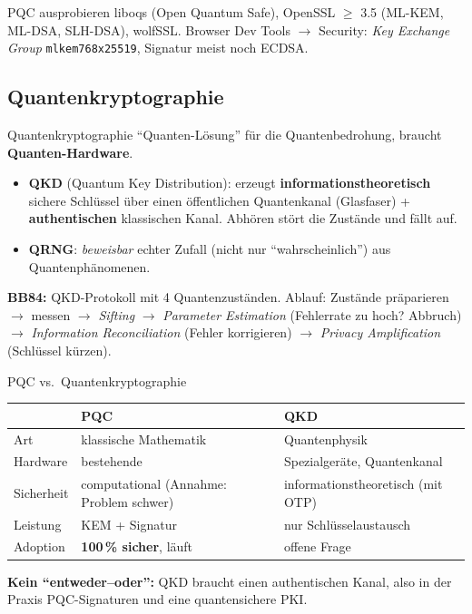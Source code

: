 \documentclass[a4paper, fontsize=7pt]{scrartcl}
\renewcommand*{\arraystretch}{1.5}  %
\begin{document}
\begin{subbox}{PQC ausprobieren}
liboqs (Open Quantum Safe), OpenSSL $\ge$ 3.5 (ML-KEM, ML-DSA, SLH-DSA), wolfSSL.
Browser Dev Tools $\to$ Security: \emph{Key Exchange Group} \texttt{mlkem768x25519},
Signatur meist noch ECDSA.
\end{subbox}

\subsection{Quantenkryptographie}

\begin{mainbox}{Quantenkryptographie}
``Quanten-Lösung'' für die Quantenbedrohung, braucht \textbf{Quanten-Hardware}.
\begin{itemize}
    \item \textbf{QKD} (Quantum Key Distribution): erzeugt
          \textbf{informationstheoretisch} sichere Schlüssel über einen
          öffentlichen Quantenkanal (Glasfaser) + \textbf{authentischen}
          klassischen Kanal. Abhören stört die Zustände und fällt auf.
    \item \textbf{QRNG}: \emph{beweisbar} echter Zufall (nicht nur
          ``wahrscheinlich'') aus Quantenphänomenen.
\end{itemize}
\textbf{BB84:} QKD-Protokoll mit 4 Quantenzuständen. Ablauf: Zustände
präparieren $\to$ messen $\to$ \emph{Sifting} $\to$ \emph{Parameter Estimation}
(Fehlerrate zu hoch? Abbruch) $\to$ \emph{Information Reconciliation} (Fehler
korrigieren) $\to$ \emph{Privacy Amplification} (Schlüssel kürzen).
\end{mainbox}

\begin{mainbox}{PQC vs.\ Quantenkryptographie}
\renewcommand*{\arraystretch}{1.15}
\setlength{\tabcolsep}{3pt}
\begin{tabularx}{\linewidth}{@{}l|>{\raggedright\arraybackslash}X|>{\raggedright\arraybackslash}X@{}}
 & \textbf{PQC} & \textbf{QKD} \\
\hline
Art & klassische Mathematik & Quantenphysik \\
Hardware & bestehende & Spezialgeräte, Quantenkanal \\
Sicherheit & computational (Annahme: Problem schwer) & informations\-theoretisch
  (mit OTP) \\
Leistung & KEM + Signatur & nur Schlüssel\-austausch \\
Adoption & \textbf{100\,\% sicher}, läuft & offene Frage \\
\end{tabularx}
\textbf{Kein ``entweder--oder'':} QKD braucht einen authentischen Kanal, also in
der Praxis PQC-Signaturen und eine quantensichere PKI.
\end{mainbox}
\end{document}
